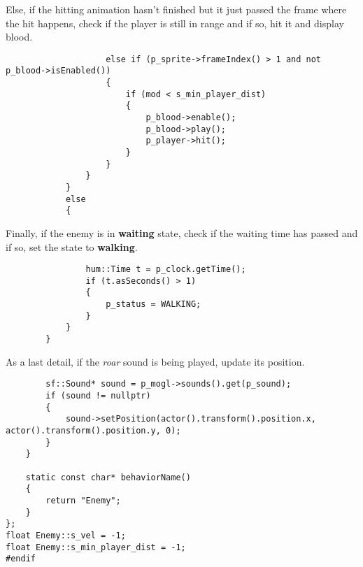 Else, if the hitting animation hasn't finished but it just passed the frame where the 
hit happens, check if the player is still in range and if so, hit it and display blood.

\begin{lstlisting}
                    else if (p_sprite->frameIndex() > 1 and not p_blood->isEnabled())
                    {
                        if (mod < s_min_player_dist)
                        {
                            p_blood->enable();
                            p_blood->play();
                            p_player->hit();
                        }
                    }
                }
            }
            else
            {
\end{lstlisting}

Finally, if the enemy is in \textbf{waiting} state, check if the waiting time has 
passed and if so, set the state to \textbf{walking}.

\begin{lstlisting}
                hum::Time t = p_clock.getTime();
                if (t.asSeconds() > 1)
                {
                    p_status = WALKING;
                }
            }
        }
\end{lstlisting}

As a last detail, if the \textit{roar} sound is being played, update its position.
\begin{lstlisting}
        sf::Sound* sound = p_mogl->sounds().get(p_sound);
        if (sound != nullptr)
        {
            sound->setPosition(actor().transform().position.x, actor().transform().position.y, 0);
        }
    }

    static const char* behaviorName()
    {
        return "Enemy";
    }
};
float Enemy::s_vel = -1;
float Enemy::s_min_player_dist = -1;
#endif
\end{lstlisting}
